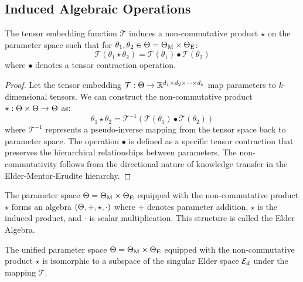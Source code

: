 \subsection{Induced Algebraic Operations}

\begin{proposition}
The tensor embedding function $\mathcal{T}$ induces a non-commutative product $\star$ on the parameter space such that for $\theta_1, \theta_2 \in \Theta = \Theta_{\text{M}} \times \Theta_{\text{E}}$:
\begin{equation}
\mathcal{T}(\theta_1 \star \theta_2) = \mathcal{T}(\theta_1) \bullet \mathcal{T}(\theta_2)
\end{equation}
where $\bullet$ denotes a tensor contraction operation.
\end{proposition}

\begin{proof}
Let the tensor embedding $\mathcal{T}: \Theta \rightarrow \mathbb{R}^{d_1 \times d_2 \times \cdots \times d_k}$ map parameters to $k$-dimensional tensors. We can construct the non-commutative product $\star: \Theta \times \Theta \rightarrow \Theta$ as:
\begin{equation}
\theta_1 \star \theta_2 = \mathcal{T}^{-1}(\mathcal{T}(\theta_1) \bullet \mathcal{T}(\theta_2))
\end{equation}
where $\mathcal{T}^{-1}$ represents a pseudo-inverse mapping from the tensor space back to parameter space. The operation $\bullet$ is defined as a specific tensor contraction that preserves the hierarchical relationships between parameters. The non-commutativity follows from the directional nature of knowledge transfer in the Elder-Mentor-Erudite hierarchy.
\end{proof}

\begin{definition}
The parameter space $\Theta = \Theta_{\text{M}} \times \Theta_{\text{E}}$ equipped with the non-commutative product $\star$ forms an algebra $(\Theta, +, \star, \cdot)$ where $+$ denotes parameter addition, $\star$ is the induced product, and $\cdot$ is scalar multiplication. This structure is called the Elder Algebra.
\end{definition}

\begin{theorem}
The unified parameter space $\Theta = \Theta_{\text{M}} \times \Theta_{\text{E}}$ equipped with the non-commutative product $\star$ is isomorphic to a subspace of the singular Elder space $\mathcal{E}_{d}$ under the mapping $\mathcal{T}$.
\end{theorem}

